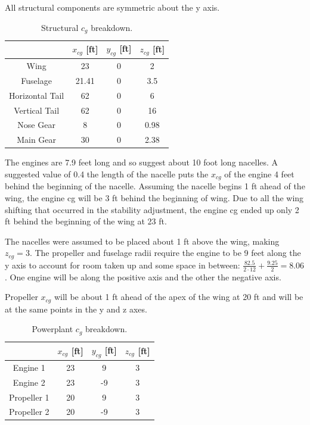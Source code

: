 \documentclass[conf]{new-aiaa}
\begin{document}
All structural components are symmetric about the y axis.
\begin{table}[H]
\centering
\label{tab:Structural cg}
\caption{Structural $c_g$ breakdown.}
\begin{tabular}{|c|c|c|c|}\hline
	             & $x_{cg}$ [ft] & $y_{cg}$ [ft] & $z_{cg}$ [ft] \\ \hline
Wing             & 23            & 0             & 2             \\ \hline
Fuselage         & 21.41         & 0             & 3.5           \\ \hline
Horizontal Tail  & 62            & 0             & 6             \\ \hline
Vertical Tail    & 62            & 0             & 16            \\ \hline
Nose Gear        & 8             & 0             & 0.98          \\ \hline
Main Gear        & 30            & 0             & 2.38          \\ \hline 
\end{tabular}
\end{table}


The engines are 7.9 feet long and so suggest about 10 foot long nacelles. A suggested value of 0.4 the length of the nacelle \cite{pres19} puts the $x_{cg}$ of the engine 4 feet behind the beginning of the nacelle. Assuming the nacelle begins 1 ft ahead of the wing, the engine cg will be 3 ft behind the beginning of wing. Due to all the wing shifting that occurred in the stability adjustment, the engine cg ended up only 2 ft behind the beginning of the wing at 23 ft. 

The nacelles were assumed to be placed about 1 ft above the wing, making $z_{cg} = 3$. The propeller and fuselage radii require the engine to be 9 feet along the y axis to account for room taken up and some space in between: $\frac{82.5}{2\cdot12}+\frac{9.25}{2}=8.06$. One engine will be along the positive axis and the other the negative axis.

Propeller $x_{cg}$ will be about 1 ft ahead of the apex of the wing at 20 ft and will be at the same points in the y and z axes.

\begin{table}[H]
\centering
\label{tab:Powerplant cg}
\caption{Powerplant $c_g$ breakdown.}
\begin{tabular}{|c|c|c|c|}\hline
	& $x_{cg}$ [ft] & $y_{cg}$ [ft] & $z_{cg}$ [ft] \\ \hline
Engine 1 & 23 & 9 & 3\\ \hline
Engine 2 & 23 & -9 & 3\\ \hline
Propeller 1 & 20 & 9 & 3 \\ \hline
Propeller 2 & 20 & -9 & 3\\ \hline
\end{tabular}
\end{table}
\end{document}
